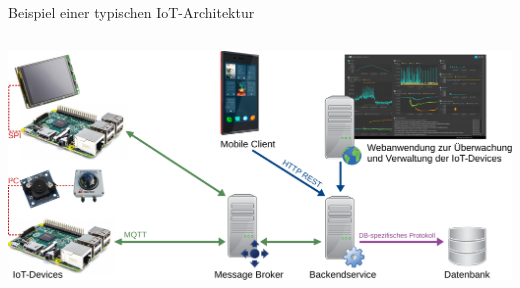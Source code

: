 {

\begin{frame}[plain]
\end{frame}
}

\begin{frame}{Beispiel einer typischen IoT-Architektur}
    \begin{columns}
        \column{\dimexpr\paperwidth-10pt}
        \includegraphics[width=\textwidth]{1-grundlagen/img/architektur_beispiel}
    \end{columns}
\end{frame}


